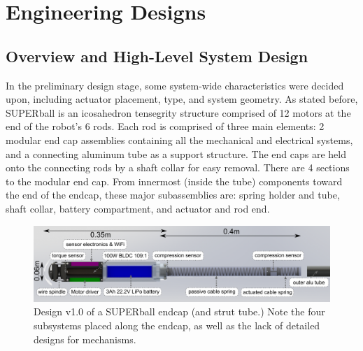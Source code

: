 \documentclass[12pt]{report}
\begin{document}



\chapter{Engineering Designs}

\section{Overview and High-Level System Design}

In the preliminary design stage, some system-wide characteristics were decided upon, including actuator placement, type, and system geometry.
As stated before, SUPERball is an icosahedron tensegrity structure comprised of 12 motors at the end of the robot's 6 rods.
Each rod is comprised of three main elements: 2 modular end cap assemblies containing all the mechanical and electrical systems, and a connecting aluminum tube as a support structure.
The end caps are held onto the connecting rods by a shaft collar for easy removal.
There are 4 sections to the modular end cap.
From innermost (inside the tube) components toward the end of the endcap, these major subassemblies are: spring holder and tube, shaft collar, battery compartment, and actuator and rod end.

\begin{figure}[thpb]
      \centering
      \includegraphics[width=0.9\columnwidth]{img/strut.png}
      \caption{Design v1.0 of a SUPERball endcap (and strut tube.) Note the four subsystems placed along the endcap, as well as the lack of detailed designs for mechanisms.}
      \label{fig:strutrender}
      \vspace{-0.2cm}
\end{figure}
\end{document}
